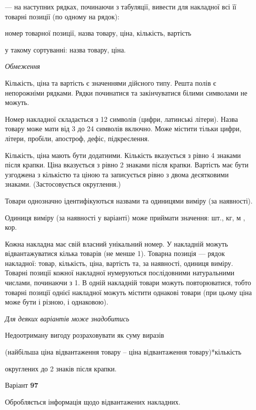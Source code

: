 \documentclass[11pt, ukrainian]{article}
\begin{document}
{\noindent}--- на наступних рядках, починаючи з табуляції, вивести для накладної всі її товарні позиції (по одному на рядок):\par
номер товарної позиції, назва товару, ціна, кількість, вартість

{\noindent}у такому сортуванні: назва товару, ціна.


\bigskip\textit{Обмеження}

Кількість, ціна та вартість є значеннями дійсного типу.
Решта полів є непорожніми рядками.
Рядки починатися та закінчуватися білими символами не можуть.

Номер накладної складається з 12 символів (цифри, латинські літери).
Назва товару може мати від 3 до 24 символів включно.
Може містити тільки цифри, літери, пробіли, апостроф, дефіс, підкреслення.

Кількість, ціна мають бути додатними.
Кількість вказується з рівно 4 знаками після крапки.
Ціна вказується з рівно 2 знаками після крапки.
Вартість має бути узгоджена з кількістю та ціною та записується рівно з двома десятковими знаками.
(Застосовується округлення.)

Товари однозначно ідентифікуються назвами та одиницями виміру (за наявності).

Одиниця виміру (за наявності у варіанті) може приймати значення: шт., кг, м , кор.

Кожна накладна має свій власний унікальний номер.
У накладній можуть відвантажуватися кілька товарів (не менше 1).
Товарна позиція --- рядок накладної: товар, кількість, ціна, вартість та, за наявності, одиниця виміру.
Товарні позиції кожної накладної нумеруються послідовними натуральними числами, починаючи з 1.
В одній накладній товари можуть повторюватися, 
тобто товарні позиції однієї накладної можуть містити однакові товари 
(при цьому ціна може бути і різною, і однаковою).

\bigskip\textit{Для деяких варіантів може знадобитись}

Недоотриману вигоду розраховувати як суму виразів
{\center (найбільша ціна відвантаження товару – ціна відвантаження товару)*кількість\par}

\bigskip
{\noindent} округлених до 2 знаків після крапки.




\par
\newpage
{\center Варіант  \No \textbf { 97 }\par}
\bigskip
Обробляється інформація щодо відвантажених накладних.
\end{document}
